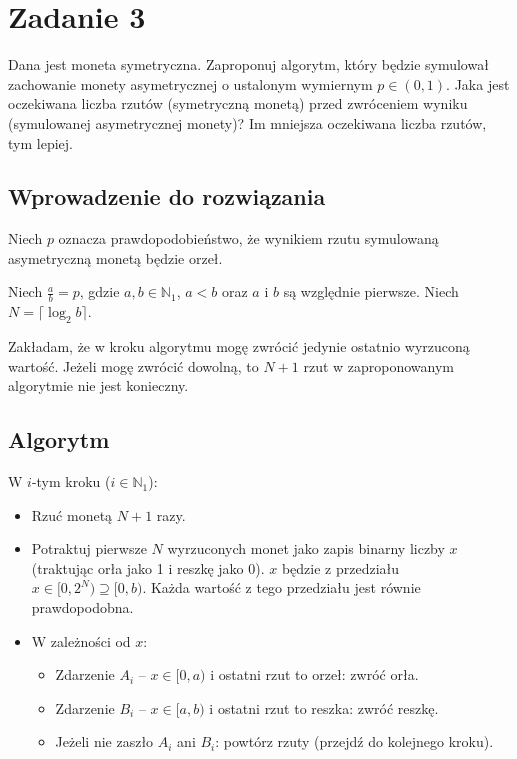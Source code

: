 \section{Zadanie 3}
Dana jest moneta symetryczna. Zaproponuj algorytm, który będzie symulował
zachowanie monety asymetrycznej o ustalonym wymiernym \(p \in (0, 1)\).
Jaka jest oczekiwana liczba rzutów (symetryczną monetą) przed zwróceniem wyniku
(symulowanej asymetrycznej monety)? Im mniejsza oczekiwana liczba rzutów, tym lepiej.

\subsection*{Wprowadzenie do rozwiązania}
Niech \(p\) oznacza prawdopodobieństwo, że wynikiem rzutu symulowaną asymetryczną
monetą będzie orzeł.

Niech \(\frac{a}{b} = p\), gdzie \(a, b \in \mathbb{N}_1\), \(a < b\)
oraz \(a\) i \(b\) są względnie pierwsze.
Niech \(N = \lceil \log_2 b \rceil\).

Zakładam, że w kroku algorytmu mogę zwrócić jedynie ostatnio wyrzuconą wartość.
Jeżeli mogę zwrócić dowolną, to \(N+1\) rzut w zaproponowanym algorytmie nie
jest konieczny.

\subsection*{Algorytm}
W \(i\)-tym kroku (\(i \in \mathbb{N}_1\)):
\begin{itemize}
	\item Rzuć monetą \(N+1\) razy.
	\item Potraktuj pierwsze \(N\) wyrzuconych monet jako zapis binarny liczby \(x\)
	      (traktując orła jako 1 i reszkę jako 0). \(x\) będzie z przedziału
	      \(x \in [0, 2^N) \supseteq [0, b)\).
	      Każda wartość z tego przedziału jest równie prawdopodobna.
	\item W zależności od \(x\):
	      \begin{itemize}
		      \item Zdarzenie \(A_i\) -- \(x \in [0, a)\) i ostatni rzut to orzeł: zwróć orła.
		      \item Zdarzenie \(B_i\) -- \(x \in [a, b)\) i ostatni rzut to reszka: zwróć reszkę.
		      \item Jeżeli nie zaszło \(A_i\) ani \(B_i\): powtórz rzuty (przejdź do kolejnego kroku).
	      \end{itemize}
\end{itemize}

